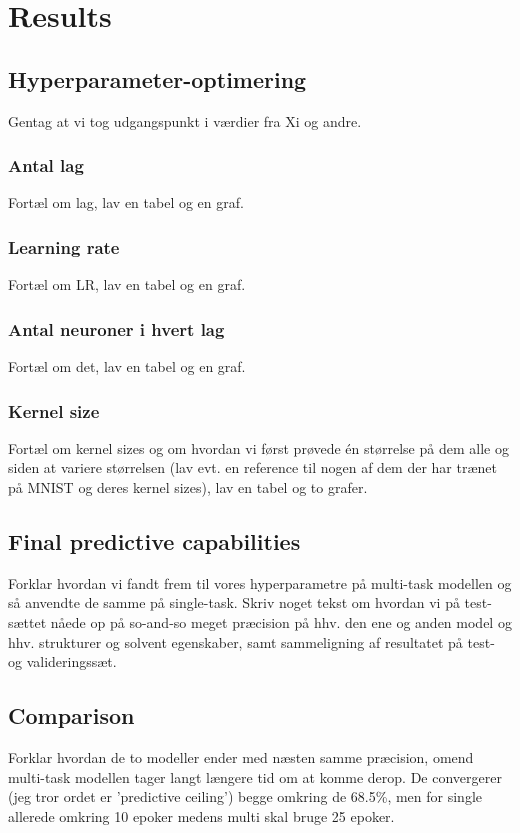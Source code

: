 \section{Results}

\subsection{Hyperparameter-optimering}
Gentag at vi tog udgangspunkt i værdier fra Xi og andre.
\subsubsection{Antal lag}
Fortæl om lag, lav en tabel og en graf.

\subsubsection{Learning rate}
Fortæl om LR, lav en tabel og en graf.

\subsubsection{Antal neuroner i hvert lag}
Fortæl om det, lav en tabel og en graf.

\subsubsection{Kernel size}
Fortæl om kernel sizes og om hvordan vi først prøvede én størrelse på dem alle og siden at variere størrelsen (lav evt. en reference til nogen af dem der har trænet på MNIST og deres kernel sizes), lav en tabel og to grafer.


\subsection{Final predictive capabilities}
Forklar hvordan vi fandt frem til vores hyperparametre på multi-task modellen og så anvendte de samme på single-task. Skriv noget tekst om hvordan vi på test-sættet nåede op på so-and-so meget præcision på hhv. den ene og anden model og hhv. strukturer og solvent egenskaber, samt sammeligning af resultatet på test- og valideringssæt.


\subsection{Comparison}
Forklar hvordan de to modeller ender med næsten samme præcision, omend multi-task modellen tager langt længere tid om at komme derop. De convergerer (jeg tror ordet er 'predictive ceiling') begge omkring de 68.5\%, men for single allerede omkring 10 epoker medens multi skal bruge 25 epoker.
